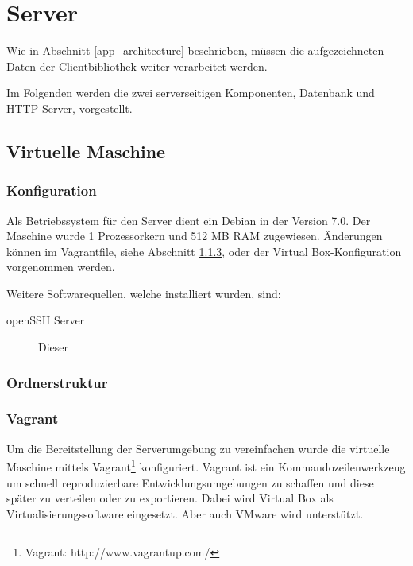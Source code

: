 \section{Server}
\label{server}
Wie in Abschnitt \ref{app_architecture} beschrieben, müssen die aufgezeichneten Daten der Clientbibliothek weiter verarbeitet werden. %

Im Folgenden werden die zwei serverseitigen Komponenten, Datenbank und HTTP-Server, vorgestellt. 


\subsection{Virtuelle Maschine}

\subsubsection{Konfiguration}

Als Betriebssystem für den Server dient ein Debian in der Version 7.0. Der Maschine wurde 1 Prozessorkern und 512 MB RAM zugewiesen. Änderungen können im Vagrantfile, siehe Abschnitt \ref{vagrant}, oder der Virtual Box-Konfiguration vorgenommen werden.

Weitere Softwarequellen, welche installiert wurden, sind: 
\begin{description}
	\item[openSSH Server] 
	Dieser 
\end{description}


\subsubsection{Ordnerstruktur}
\begin{minipage}[c]{\textwidth} %
\end{minipage}


\subsubsection{Vagrant}
\label{vagrant}
Um die Bereitstellung der Serverumgebung zu vereinfachen wurde die virtuelle Maschine mittels Vagrant\footnote{Vagrant: http://www.vagrantup.com/} konfiguriert. Vagrant ist ein Kommandozeilenwerkzeug um schnell reproduzierbare Entwicklungsumgebungen zu schaffen und diese später zu verteilen oder zu exportieren. Dabei wird Virtual Box als Virtualisierungssoftware eingesetzt. Aber auch VMware wird unterstützt. 

